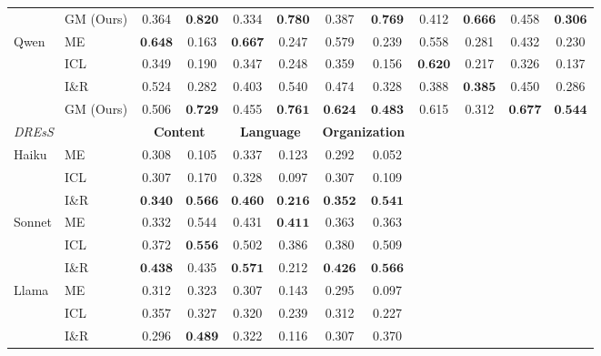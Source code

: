 \documentclass[11pt]{article}
\begin{document}
\begin{table}[!htbp]
{\begin{tabular}{ll  cc  cc  cc  cc  cc}
  & GM (Ours) & 0.364 & $\textbf{0.820}$ & 0.334 & $\textbf{0.780}$ & 0.387 & $\textbf{0.769}$ & 0.412 & $\textbf{0.666}$ & 0.458 & $\textbf{0.306}$ \\
\cmidrule(l){2-12}
\multirow{4}{*}{Qwen}
  & ME       & $\textbf{0.648}$ & 0.163 & $\textbf{0.667}$ & 0.247 & 0.579 & 0.239 & 0.558 & 0.281 & 0.432 & 0.230 \\
  & ICL      & 0.349 & 0.190 & 0.347 & 0.248 & 0.359 & 0.156 & $\textbf{0.620}$ & 0.217 & 0.326 & 0.137 \\
  & I\&R     & 0.524 & 0.282 & 0.403 & 0.540 & 0.474 & 0.328 & 0.388 & $\textbf{0.385}$ & 0.450 & 0.286 \\
  & GM (Ours) & 0.506 & $\textbf{0.729}$ & 0.455 & $\textbf{0.761}$ & $\textbf{0.624}$ & $\textbf{0.483}$ & 0.615 & 0.312 & $\textbf{0.677}$ & $\textbf{0.544}$ \\
\midrule
\multicolumn{2}{l}{\textit{DREsS}}
  & \multicolumn{2}{c}{\textbf{Content}}
  & \multicolumn{2}{c}{\textbf{Language}}
  & \multicolumn{2}{c}{\textbf{Organization}}
  & \multicolumn{4}{c}{} \\
\midrule
\multirow{3}{*}{Haiku}
  & ME       & 0.308 & 0.105 & 0.337 & 0.123 & 0.292 & 0.052 & & & & \\
  & ICL      & 0.307 & 0.170 & 0.328 & 0.097 & 0.307 & 0.109 & & & & \\
  & I\&R     & $\textbf{0.340}$ & $\textbf{0.566}$ & $\textbf{0.460}$ & $\textbf{0.216}$ & $\textbf{0.352}$ & $\textbf{0.541}$ & & & & \\
\cmidrule(l){2-12}
\multirow{3}{*}{Sonnet}
  & ME       & 0.332 & 0.544 & 0.431 & $\textbf{0.411}$ & 0.363 & 0.363 & & & & \\
  & ICL      & 0.372 & $\textbf{0.556}$ & 0.502 & 0.386 & 0.380 & 0.509 & & & & \\
  & I\&R     & $\textbf{0.438}$ & 0.435 & $\textbf{0.571}$ & 0.212 & $\textbf{0.426}$ & $\textbf{0.566}$ & & & & \\
\cmidrule(l){2-12}
\multirow{4}{*}{Llama}
  & ME       & 0.312 & 0.323 & 0.307 & 0.143 & 0.295 & 0.097 & & & & \\
  & ICL      & 0.357 & 0.327 & 0.320 & 0.239 & 0.312 & 0.227 & & & & \\
  & I\&R     & 0.296 & $\textbf{0.489}$ & 0.322 & 0.116 & 0.307 & 0.370 & & & & \\

\end{tabular}}
\end{table}
\end{document}
